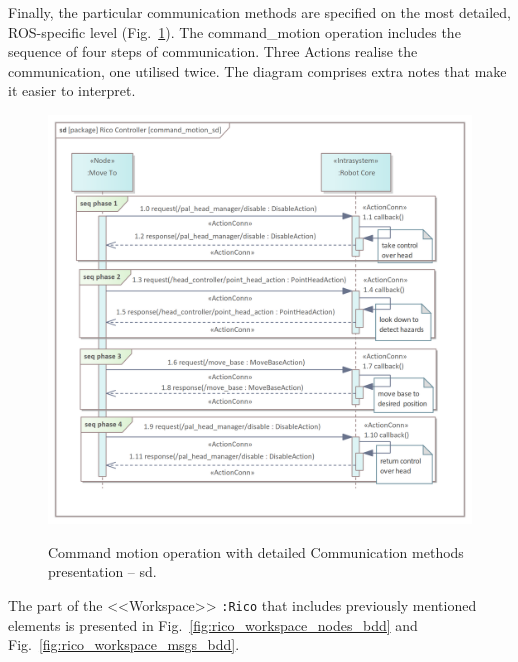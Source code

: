 \documentclass[11pt,oneside,a4paper]{article}
\begin{document}
\pagebreak


	Finally, the particular communication methods are specified on the most detailed, ROS-specific level (Fig.~\ref{fig:command_motion_sd}). The command\_motion operation includes the sequence of four steps of communication. Three Actions realise the communication, one utilised twice. The diagram comprises extra notes that make it easier to interpret.
	
	\begin{figure}[H]
		\centering
		\begin{center}
			{\includegraphics[scale=1.0]{img/rico_pkg/command_motion_sd.png}}
		\end{center}
		\caption{Command motion operation with detailed Communication methods presentation -- sd.} 
		\label{fig:command_motion_sd}
	\end{figure}
	
	\pagebreak
	
	The part of the <<Workspace>> \texttt{:Rico} that includes previously mentioned elements is presented in Fig.~\ref{fig:rico_workspace_nodes_bdd} and Fig.~\ref{fig:rico_workspace_msgs_bdd}.
	
\end{document}
